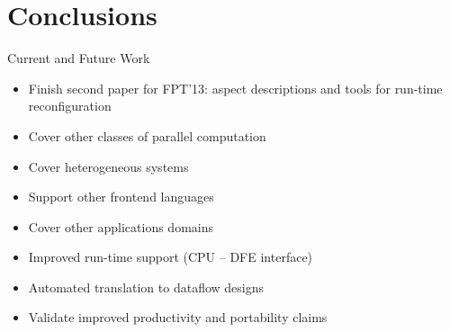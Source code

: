 \section{Conclusions}

\begin{frame}{Current and Future Work}

  \begin{itemize}
    \setlength{\itemsep}{10pt}

  \item Finish second paper for FPT'13: aspect descriptions and tools
    for run-time reconfiguration

  \item Cover other classes of parallel computation

  \item Cover heterogeneous systems

  \item Support other frontend languages

  \item Cover other applications domains

  \item Improved run-time support (CPU -- DFE interface)

  \item Automated translation to dataflow designs

  \item Validate improved productivity and
    portability claims

  \end{itemize}
\end{frame}


